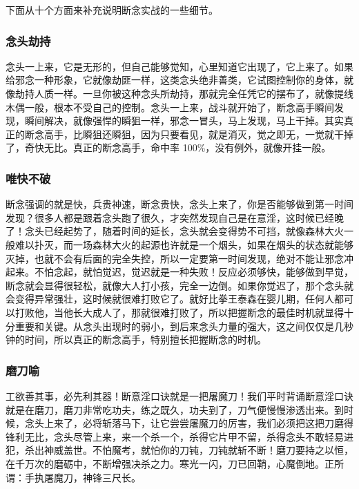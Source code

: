 下面从十个方面来补充说明断念实战的一些细节。

\subsubsection{念头劫持}

念头一上来，它是无形的，但自己能够觉知，心里知道它出现了，它上来了。如果给邪念一种形象，它就像劫匪一样，这类念头绝非善类，它试图控制你的身体，就像劫持人质一样。一旦你被这种念头所劫持，那就完全任凭它的摆布了，就像提线木偶一般，根本不受自己的控制。念头一上来，战斗就开始了，断念高手瞬间发现，瞬间解决，就像强悍的瞬狙一样，邪念一冒头，马上发现，马上干掉。其实真正的断念高手，比瞬狙还瞬狙，因为只要看见，就是消灭，觉之即无，一觉就干掉了，奇快无比。真正的断念高手，命中率 100\%，没有例外，就像开挂一般。

\subsubsection{唯快不破}

断念强调的就是快，兵贵神速，断念贵快，念头上来了，你是否能够做到第一时间发现？很多人都是跟着念头跑了很久，才突然发现自己是在意淫，这时候已经晚了！念头已经起势了，随着时间的延长，念头就会变得势不可挡，就像森林大火一般难以扑灭，而一场森林大火的起源也许就是一个烟头，如果在烟头的状态就能够灭掉，也就不会有后面的完全失控，所以一定要第一时间发现，绝对不能让邪念冲起来。不怕念起，就怕觉迟，觉迟就是一种失败！反应必须够快，能够做到早觉，断念就会显得很轻松，就像大人打小孩，完全一边倒。如果你觉迟了，那个念头就会变得异常强壮，这时候就很难打败它了。就好比拳王泰森在婴儿期，任何人都可以打败他，当他长大成人了，那就很难打败了，所以把握断念的最佳时机就显得十分重要和关键。从念头出现时的弱小，到后来念头力量的强大，这之间仅仅是几秒钟的时间，所以真正的断念高手，特别擅长把握断念的时机。

\subsubsection{磨刀喻}

工欲善其事，必先利其器！断意淫口诀就是一把屠魔刀！我们平时背诵断意淫口诀就是在磨刀，磨刀非常吃功夫，练之既久，功夫到了，刀气便慢慢渗透出来。到时候，念头上来了，必将斩落马下，让它尝尝屠魔刀的厉害，我们必须把这把刀磨得锋利无比，念头尽管上来，来一个杀一个，杀得它片甲不留，杀得念头不敢轻易进犯，杀出神威盖世。不怕魔考，就怕你的刀钝，刀钝就斩不断！磨刀要持之以恒，在千万次的磨砺中，不断增强决杀之力。寒光一闪，刀已回鞘，心魔倒地。正所谓：手执屠魔刀，神锋三尺长。

